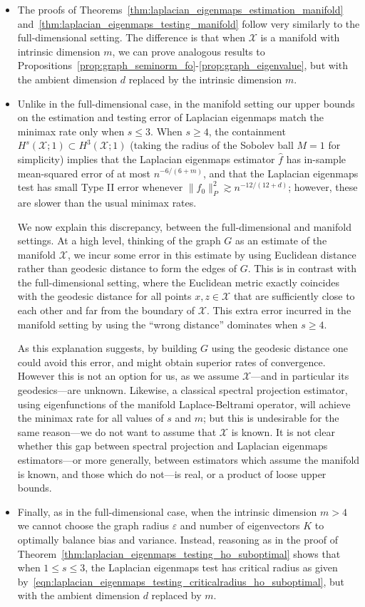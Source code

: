 \documentclass{article}
\newcommand{\1}{\mathbf{1}}
\newcommand{\mc}[1]{\mathcal{#1}}
\newcommand{\wh}[1]{\widehat{#1}}
\theoremstyle{alden}
\theoremstyle{aldenthm}
\theoremstyle{definition}
\theoremstyle{remark}
\begin{document}
\begin{itemize}
	\item The proofs of Theorems~\ref{thm:laplacian_eigenmaps_estimation_manifold} and~\ref{thm:laplacian_eigenmaps_testing_manifold} follow very similarly to the full-dimensional setting. The difference is that when $\mc{X}$ is a manifold with intrinsic dimension $m$, we can prove analogous results to Propositions~\ref{prop:graph_seminorm_fo}-\ref{prop:graph_eigenvalue}, but with the ambient dimension $d$ replaced by the intrinsic dimension $m$. 
	\item Unlike in the full-dimensional case, in the manifold setting our upper bounds on the estimation and testing error of Laplacian eigenmaps match the minimax rate only when $s \leq 3$.  When $s \geq 4$, the containment $H^s(\mc{X};1) \subset H^{3}(\mc{X};1)$ (taking the radius of the Sobolev ball $M = 1$ for simplicity) implies that the Laplacian eigenmaps estimator $\wh{f}$ has in-sample mean-squared error of at most $n^{-6/(6 + m)}$, and that the Laplacian eigenmaps test has small Type II error whenever $\|f_0\|_P^2 \gtrsim n^{-12/(12 + d)}$; however, these are slower than the usual minimax rates. 
	
	We now explain this discrepancy, between the full-dimensional and manifold settings. At a high level, thinking of the graph $G$ as an estimate of the manifold $\mc{X}$, we incur some error in this estimate by using Euclidean distance rather than geodesic distance to form the edges of $G$. This is in contrast with the full-dimensional setting, where the Euclidean metric exactly coincides with the geodesic distance for all points $x,z \in \mc{X}$ that are sufficiently close to each other and far from the boundary of $\mc{X}$. This extra error incurred in the manifold setting by using the ``wrong distance'' dominates when $s \geq 4$. 
	
	As this explanation suggests, by building $G$ using the geodesic distance one could avoid this error, and might obtain superior rates of convergence. However this is not an option for us, as we assume $\mc{X}$---and in particular its geodesics---are unknown. Likewise, a classical spectral projection estimator, using eigenfunctions of the manifold Laplace-Beltrami operator, will achieve the minimax rate for all values of $s$ and $m$; but this is undesirable for the same reason---we do not want to assume that $\mc{X}$ is known. It is not clear whether this gap between spectral projection and Laplacian eigenmaps estimators---or more generally, between estimators which assume the manifold is known, and those which do not---is real, or a product of loose upper bounds. 
	
	\item Finally, as in the full-dimensional case, when the intrinsic dimension $m > 4$ we cannot choose the graph radius $\varepsilon$ and number of eigenvectors $K$ to optimally balance bias and variance.  Instead, reasoning as in the proof of Theorem~\ref{thm:laplacian_eigenmaps_testing_ho_suboptimal} shows that when $1 \leq s \leq 3$, the Laplacian eigenmaps test has critical radius as given by~\eqref{eqn:laplacian_eigenmaps_testing_criticalradius_ho_suboptimal}, but with the ambient dimension $d$ replaced by $m$.
\end{itemize}
\end{document}
